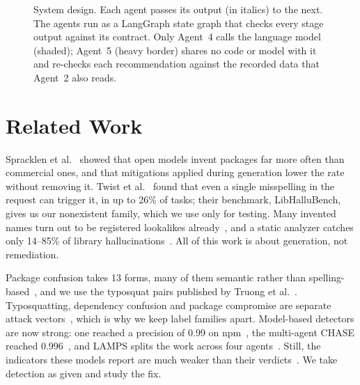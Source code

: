 \documentclass[conference]{IEEEtran}
\begin{document}
\begin{figure}[t]
{}
\caption{System design. Each agent passes its output (in italics) to the next. The agents run as a LangGraph state
graph that checks every stage output against its contract. Only Agent~4 calls the language model (shaded);
Agent~5 (heavy border) shares no code or model with it and re-checks each recommendation against the recorded
data that Agent~2 also reads.}
\label{fig:pipeline}
\end{figure}

\section{Related Work}

Spracklen et al.~\cite{spracklen2025} showed that open models invent packages far more often than commercial ones,
and that mitigations applied during generation lower the rate without removing it. Twist et al.~\cite{twist2026}
found that even a single misspelling in the request can trigger it, in up to 26\% of tasks; their benchmark,
LibHalluBench, gives us our nonexistent family, which we use only for testing. Many invented names turn out to be
registered lookalikes already~\cite{raj2026}, and a static analyzer catches only 14--85\% of library
hallucinations~\cite{mirandapena2026}. All of this work is about generation, not remediation.

Package confusion takes 13 forms, many of them semantic rather than spelling-based~\cite{neupane2023}, and we use
the typosquat pairs published by Truong et al.~\cite{truong2025}. Typosquatting, dependency confusion and package
compromise are separate attack vectors~\cite{ladisa2023}, which is why we keep label families apart. Model-based
detectors are now strong: one reached a precision of 0.99 on npm~\cite{zahan2025}, the multi-agent CHASE reached
0.996~\cite{toda2025}, and LAMPS splits the work across four agents~\cite{zeshan2026}. Still, the indicators these
models report are much weaker than their verdicts~\cite{ryan2026}. We take detection as given and study the fix.
\end{document}
